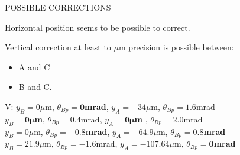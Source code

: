 \vspace*{0.5cm}
POSSIBLE CORRECTIONS\\\raggedright
Horizontal position seems to be possible to correct.\par
Vertical correction at least to $\mu$m precision is possible between:
\begin{itemize}
 \item A and C
 \item B and C.
\end{itemize}
V:\hspace*{0.1cm} $y_B=0\mu$m, $\theta_{Bp}=\boldsymbol{0}$\textbf{mrad},\hspace{10mm} $y_A=-34\mu$m, $\theta_{Bp}=1.6$mrad\\
\hspace*{0.45cm} $y_B=\boldsymbol{0\mu}$\textbf{m}, $\theta_{Bp}=0.4$mrad,\hspace{7mm} $y_A=\boldsymbol{0\mu}$\textbf{m	}, $\theta_{Bp}=2.0$mrad\\
\hspace*{0.45cm} $y_B=0\mu$m, $\theta_{Bp}=\boldsymbol{-0.8}$\textbf{mrad},\hspace{3mm} $y_A=-64.9\mu$m, $\theta_{Bp}=\boldsymbol{0.8}$\textbf{mrad}\\
\hspace*{0.45cm} $y_B=21.9\mu$m, $\theta_{Bp}=-1.6$mrad, $y_A=-107.64\mu$m, $\theta_{Bp}=\boldsymbol{0}$\textbf{mrad}\\